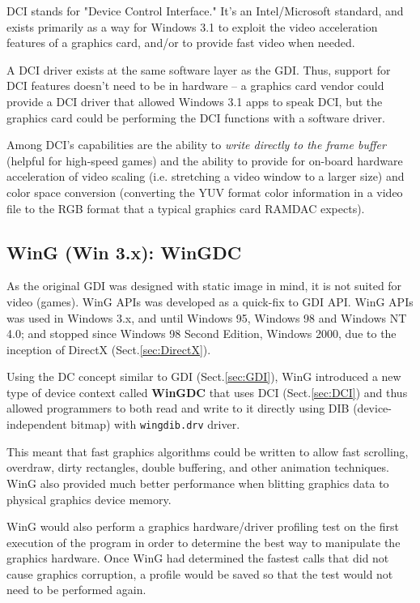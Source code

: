 DCI stands for "Device Control Interface." It's an Intel/Microsoft standard, and
exists primarily as a way for Windows 3.1 to exploit the video acceleration
features of a graphics card, and/or to provide fast video when needed. 

A DCI driver exists at the same software layer as the GDI.
Thus, support for DCI features doesn't need to be in hardware -- a graphics card
vendor could provide a DCI driver that allowed Windows 3.1 apps to speak DCI,
but the graphics card could be performing the DCI functions with a software
driver.

Among DCI's capabilities are the ability to {\it write directly to the frame
buffer} (helpful for high-speed games) and the ability to provide for on-board
hardware acceleration of video scaling (i.e. stretching a video window to a
larger size) and color space conversion (converting the YUV format color
information in a video file to the RGB format that a typical graphics card
RAMDAC expects).


\subsection{WinG (Win 3.x): WinGDC}
\label{sec:WinG}

As the original GDI was designed with static image in mind, it is not suited for
video (games). WinG APIs was developed as a quick-fix to GDI API.
WinG APIs was used in Windows 3.x, and until Windows 95, Windows 98 and Windows
NT 4.0; and stopped since Windows 98 Second Edition, Windows 2000, due to the 
inception of DirectX (Sect.\ref{sec:DirectX}).

% 
Using the DC concept similar to GDI (Sect.\ref{sec:GDI}), WinG introduced a new
type of device context called {\bf WinGDC} that uses DCI (Sect.\ref{sec:DCI})
and thus allowed programmers to both read and write to it directly using DIB
(device-independent bitmap) with \verb!wingdib.drv! driver.

This meant that fast graphics algorithms could be written to allow fast
scrolling, overdraw, dirty rectangles, double buffering, and other animation
techniques.
WinG also provided much better performance when blitting graphics data to
physical graphics device memory.

WinG would also perform a graphics hardware/driver profiling test on the first
execution of the program in order to determine the best way to manipulate the
graphics hardware.
Once WinG had determined the fastest calls that did not cause graphics
corruption, a profile would be saved so that the test would not need to be
performed again.


